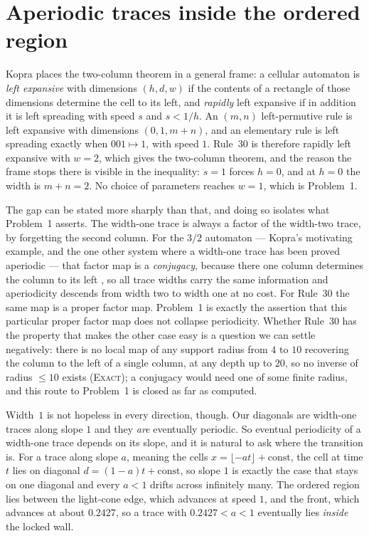 \documentclass[11pt]{article}
\theoremstyle{definition}
\theoremstyle{remark}
\newcommand{\EXACT}{\textsc{Exact}}
\begin{document}
\section{Aperiodic traces inside the ordered region}\label{fr:walltrace}

Kopra \cite{Kopra} places the two-column theorem in a general frame: a cellular automaton is
\emph{left expansive} with dimensions $(h,d,w)$ if the contents of a rectangle of those dimensions
determine the cell to its left, and \emph{rapidly} left expansive if in addition it is left spreading
with speed $s$ and $s<1/h$. An $(m,n)$ left-permutive rule is left expansive with dimensions
$(0,1,m+n)$, and an elementary rule is left spreading exactly when $001\mapsto1$, with speed $1$.
Rule~30 is therefore rapidly left expansive with $w=2$, which gives the two-column theorem, and the
reason the frame stops there is visible in the inequality: $s=1$ forces $h=0$, and at $h=0$ the width
is $m+n=2$. No choice of parameters reaches $w=1$, which is Problem~1.

The gap can be stated more sharply than that, and doing so isolates what Problem~1 asserts. The
width-one trace is always a factor of the width-two trace, by forgetting the second column. For the
$3/2$ automaton --- Kopra's motivating example, and the one other system where a width-one trace has
been proved aperiodic --- that factor map is a \emph{conjugacy}, because there one column determines the
column to its left \cite[Prop.~2.7]{Kopra2}, so all trace widths carry the same information and
aperiodicity descends from width two to width one at no cost. For Rule~30 the same map is a proper
factor map. Problem~1 is exactly the assertion that this particular proper factor map does not collapse
periodicity. Whether Rule~30 has the property that makes the other case easy is a question we can
settle negatively: there is no local map of any support radius from $4$ to $10$ recovering the column to
the left of a single column, at any depth up to $20$, so no inverse of radius $\le10$ exists (\EXACT); a conjugacy would need one of some finite radius, and
this route to Problem~1 is closed as far as computed.

Width~$1$ is not hopeless in every direction, though. Our diagonals are width-one traces along slope
$1$ and they \emph{are} eventually periodic. So eventual periodicity of a width-one trace depends on
its slope, and it is natural to ask where the transition is. For a trace along slope $a$, meaning the
cells $x=\lfloor-at\rfloor+\text{const}$, the cell at time $t$ lies on diagonal $d=(1-a)t+\text{const}$,
so slope $1$ is exactly the case that stays on one diagonal and every $a<1$ drifts across infinitely
many. The ordered region lies between the light-cone edge, which advances at speed $1$, and the front,
which advances at about $0.2427$, so a trace with $0.2427<a<1$ eventually lies \emph{inside} the locked
wall.
\end{document}
